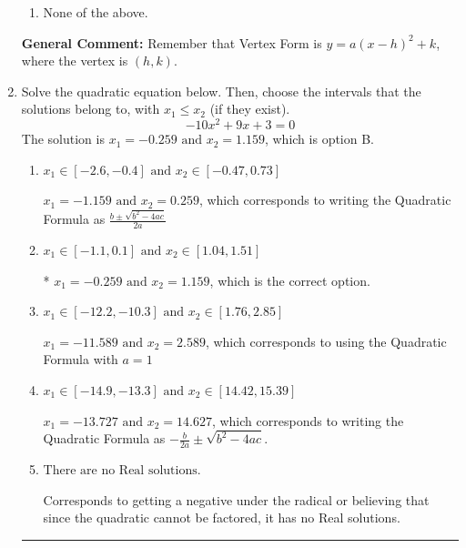 \documentclass{extbook}[14pt]
\newcommand{\litem}[1]{\item #1

\rule{\textwidth}{0.4pt}}
\begin{document}
\begin{enumerate}
{\begin{enumerate}[label=\Alph*.]
\item None of the above.\end{enumerate}
\textbf{General Comment:} Remember that Vertex Form is $y = a(x-h)^2+k$, where the vertex is $(h, k)$.
}
\litem{
Solve the quadratic equation below. Then, choose the intervals that the solutions belong to, with $x_1 \leq x_2$ (if they exist).
\[ -10x^{2} +9 x + 3 = 0 \]
The solution is \( x_1 = -0.259 \text{ and } x_2 = 1.159 \), which is option B.\begin{enumerate}[label=\Alph*.]
\item \( x_1 \in [-2.6, -0.4] \text{ and } x_2 \in [-0.47, 0.73] \)

 $x_1 = -1.159 \text{ and } x_2 = 0.259$, which corresponds to writing the Quadratic Formula as $\frac{b \pm \sqrt{b^2 - 4ac}}{2a}$
\item \( x_1 \in [-1.1, 0.1] \text{ and } x_2 \in [1.04, 1.51] \)

* $x_1 = -0.259 \text{ and } x_2 = 1.159$, which is the correct option.
\item \( x_1 \in [-12.2, -10.3] \text{ and } x_2 \in [1.76, 2.85] \)

 $x_1 = -11.589 \text{ and } x_2 = 2.589$, which corresponds to using the Quadratic Formula with $a=1$
\item \( x_1 \in [-14.9, -13.3] \text{ and } x_2 \in [14.42, 15.39] \)

 $x_1 = -13.727 \text{ and } x_2 = 14.627$, which corresponds to writing the Quadratic Formula as $-\frac{b}{2a} \pm \sqrt{b^2 - 4ac}$.
\item \( \text{There are no Real solutions.} \)

Corresponds to getting a negative under the radical or believing that since the quadratic cannot be factored, it has no Real solutions.
\end{enumerate}

}
\end{enumerate}
\end{document}
